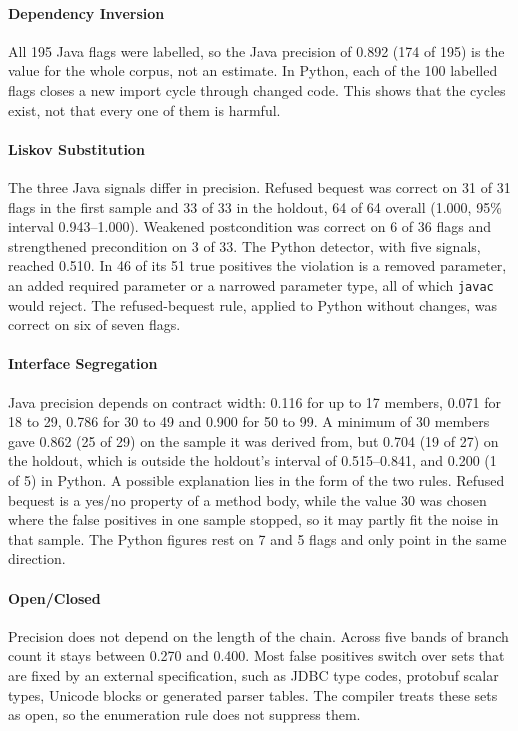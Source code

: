 \documentclass[sigconf]{acmart}
\begin{document}
\paragraph{Dependency Inversion} All 195 Java flags were labelled, so the Java precision of 0.892 (174
of 195) is the value for the whole corpus, not an estimate. In Python, each of the 100 labelled flags
closes a new import cycle through changed code. This shows that the cycles exist, not that every one
of them is harmful.

\paragraph{Liskov Substitution} The three Java signals differ in precision. Refused bequest was correct on 31
of 31 flags in the first sample and 33 of 33 in the holdout, 64 of 64 overall (1.000, 95\% interval
0.943--1.000). Weakened postcondition was correct on 6 of 36 flags and strengthened precondition on 3
of 33. The Python detector, with five signals, reached 0.510. In 46 of its 51 true positives the
violation is a removed parameter, an added required parameter or a narrowed parameter type, all of
which \texttt{javac} would reject. The refused-bequest rule, applied to Python without changes, was
correct on six of seven flags.

\paragraph{Interface Segregation} Java precision depends on contract width: 0.116 for up to 17
members, 0.071 for 18 to 29, 0.786 for 30 to 49 and 0.900 for 50 to 99. A minimum of 30 members gave
0.862 (25 of 29) on the sample it was derived from, but 0.704 (19 of 27) on the holdout, which is
outside the holdout's interval of 0.515--0.841, and 0.200 (1 of 5) in Python. A possible
explanation lies in the form of the two rules. Refused bequest is a yes/no property of a method body,
while the value 30 was chosen where the false positives in one sample stopped, so it may partly fit
the noise in that sample. The Python figures rest on 7 and 5 flags and only point in the same
direction.

\paragraph{Open/Closed} Precision does not depend on the length of the chain. Across five bands of
branch count it stays between 0.270 and 0.400. Most false positives switch over sets that are fixed
by an external specification, such as JDBC type codes, protobuf scalar types, Unicode blocks or
generated parser tables. The compiler treats these sets as open, so the enumeration rule does not
suppress them.
\end{document}
